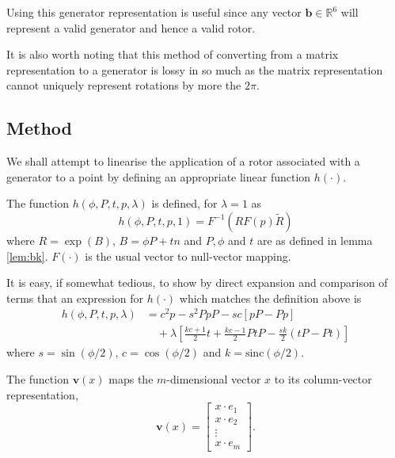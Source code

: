 Using this generator representation is useful since any vector
$\mathbf{b} \in {\mathbb R}^6$ will represent a valid generator and
hence a valid rotor.


It is also worth noting that this method of converting from a matrix
representation to a generator is lossy in so much as the matrix representation
cannot uniquely represent rotations by more the $2\pi$.

\subsection{Method}

We shall attempt to linearise the application of a rotor associated
with a generator to a point by defining an appropriate linear function
$h(\cdot)$.

\begin{definition}
The function $h(\phi, P, t, p, \lambda)$ is defined, for $\lambda = 1$ as
\[
h(\phi, P, t, p, 1) = F^{-1} \left( R F(p) \tilde{R} \right)
\]
where $R = \exp(B)$, $B = \phi P+tn$ and $P, \phi$ and $t$ are
as defined in lemma \ref{lem:bk}. $F(\cdot)$ is the usual vector 
to null-vector mapping.
\end{definition}

It is easy, if somewhat tedious, to show by direct expansion and comparison of terms that
an expression for $h(\cdot)$ which matches the definition above is
\begin{align}
h(\phi, P, t, p, \lambda) &=c^2p - s^2PpP - sc\left[pP - Pp\right] \nonumber \\
&\quad+ \lambda\left[ 
 \frac{kc+1}{2} t + \frac{kc-1}{2} PtP
- \frac{sk}{2} (tP - Pt)
\right] \label{eqn:defnh}
\end{align}
where $s = \sin(\phi/2)$, $c = \cos(\phi/2)$ and $k = \textrm{sinc}(\phi/2)$.

\begin{definition}
The function $\mathbf{v}(x)$ maps the $m$-dimensional vector $x$ to its column-vector
representation,
\[
\mathbf{v}(x) = \left[
\begin{array}{c}
x \cdot e_1 \\ x \cdot e_2 \\ \vdots \\ x \cdot e_m
\end{array} 
\right].
\]
\end{definition}

